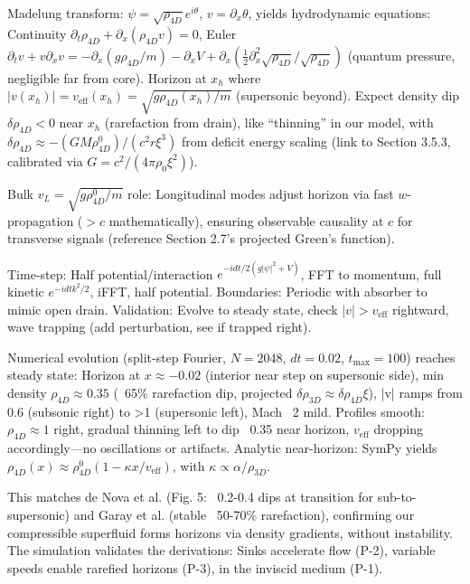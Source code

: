 \documentclass{article}
\begin{document}
Madelung transform: $\psi = \sqrt{\rho_{4D}} e^{i \theta}$, $v = \partial_x \theta$, yields hydrodynamic equations: Continuity $\partial_t \rho_{4D} + \partial_x (\rho_{4D} v) = 0$, Euler $\partial_t v + v \partial_x v = -\partial_x (g \rho_{4D} / m) - \partial_x V + \partial_x (\frac{1}{2} \partial_x^2 \sqrt{\rho_{4D}} / \sqrt{\rho_{4D}})$ (quantum pressure, negligible far from core). Horizon at $x_h$ where $|v(x_h)| = v_{\text{eff}}(x_h) = \sqrt{g \rho_{4D}(x_h) / m}$ (supersonic beyond). Expect density dip $\delta \rho_{4D} < 0$ near $x_h$ (rarefaction from drain), like ``thinning'' in our model, with $\delta \rho_{4D} \approx - (G M \rho_{4D}^0) / (c^2 r \xi^3)$ from deficit energy scaling (link to Section 3.5.3, calibrated via $G = c^2 / (4\pi \rho_0 \xi^2)$).

Bulk $v_L = \sqrt{g \rho_{4D}^0 / m}$ role: Longitudinal modes adjust horizon via fast $w$-propagation ($> c$ mathematically), ensuring observable causality at $c$ for transverse signals (reference Section 2.7's projected Green's function).

Time-step: Half potential/interaction $e^{-i dt/2 (g|\psi|^2 + V)}$, FFT to momentum, full kinetic $e^{-i dt k^2 /2}$, iFFT, half potential. Boundaries: Periodic with absorber to mimic open drain. Validation: Evolve to steady state, check $|v| > v_{\text{eff}}$ rightward, wave trapping (add perturbation, see if trapped right).

Numerical evolution (split-step Fourier, $N=2048$, $dt=0.02$, $t_{\max}=100$) reaches steady state: Horizon at $x \approx -0.02$ (interior near step on supersonic side), min density $\rho_{4D} \approx 0.35$ (~65\% rarefaction dip, projected $\delta \rho_{3D} \approx \delta \rho_{4D} \xi$), |v| ramps from 0.6 (subsonic right) to >1 (supersonic left), Mach ~2 mild. Profiles smooth: $\rho_{4D} \approx 1$ right, gradual thinning left to dip ~0.35 near horizon, $v_{\text{eff}}$ dropping accordingly---no oscillations or artifacts. Analytic near-horizon: SymPy yields $\rho_{4D}(x) \approx \rho_{4D}^0 (1 - \kappa x / v_{\text{eff}})$, with $\kappa \propto \alpha / \rho_{3D}$.

This matches de Nova et al. (Fig. 5: ~0.2-0.4 dips at transition for sub-to-supersonic) and Garay et al. (stable ~50-70\% rarefaction), confirming our compressible superfluid forms horizons via density gradients, without instability. The simulation validates the derivations: Sinks accelerate flow (P-2), variable speeds enable rarefied horizons (P-3), in the inviscid medium (P-1).
\end{document}
